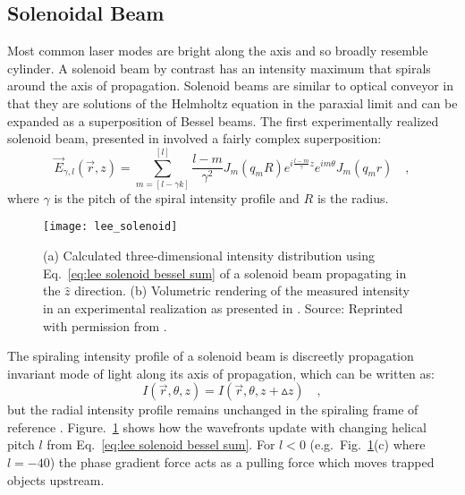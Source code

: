\subsection{Solenoidal Beam}
Most common laser modes are bright along the axis and so broadly resemble cylinder. A solenoid beam by contrast has an  intensity maximum that spirals around the axis of propagation. Solenoid beams are similar to optical conveyor in that they are solutions of the Helmholtz equation in the paraxial limit and  can be expanded as a superposition of Bessel beams. The first experimentally realized solenoid beam, presented in \cite{Lee:10} involved a fairly complex superposition:
\begin{equation}
\label{eq:lee solenoid bessel sum}
\vec{E}_{\gamma, l}(\vec{r},z) = \sum ^{[l]}_{m=[l-\gamma k]}\frac{l-m}{\gamma ^2}J_{m}(q_m R)e^{i\frac{l-m}{\gamma}z}e^{im\theta}J_{m}(q_m r) \quad ,
\end{equation}
where $\gamma$ is the pitch of the spiral intensity profile and $R$ is the radius. 


\begin{figure}[t!]
  \centering
  \texttt{[image: lee\_solenoid]}
  \caption{ (a) Calculated three-dimensional intensity distribution using Eq.~\eqref{eq:lee solenoid bessel sum} of a solenoid beam propagating in the $\hat{z}$ direction. (b) Volumetric rendering of the measured intensity in an experimental realization as presented in \cite{Lee:10}. Source: Reprinted with permission from \cite{Lee:10}.}
  \label{fig:solenoid wavefronts}
\end{figure}


The spiraling intensity profile of a solenoid beam is discreetly propagation invariant mode of light along its axis of propagation, which can be written as:
\begin{equation}
\label{eq:discreet propagation invariant}
I\left(\vec{r},\theta, z\right) = I\left(\vec{r},\theta, z+\vartriangle z\right) \quad ,
\end{equation}
but the radial intensity profile remains unchanged in the spiraling frame of reference \cite{Tervo01}. Figure.~\ref{fig:solenoid wavefronts} shows how the wavefronts update with changing helical pitch $l$ from Eq.~\eqref{eq:lee solenoid bessel sum}. For $l<0$ (e.g.~Fig.~\ref{fig:solenoid wavefronts}(c) where $l=-40$) the phase gradient force acts as a pulling force which moves trapped objects upstream.



